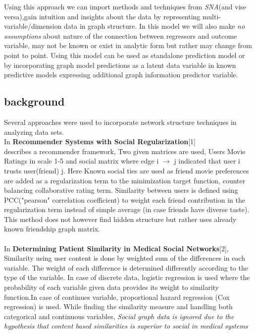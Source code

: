 \documentclass[a4paper]{article}
\begin{document}
Using this approach we can import methods and techniques from \emph{SNA}(and vise versa),gain intuition and insights about the data by representing multi-variable/dimension data in graph structure.
In this model we will also make\emph{ no assumptions} about nature of the connection between regressors and outcome variable, may not be known or exist in analytic form but rather may change from point to point.
Using this model can be used as standalone prediction model or by incorporating graph model predictions as a latent data variable in known predictive models expressing additional graph information predictor variable. 

\subsection{background}
Several approaches were used to incorporate network structure techniques in analyzing  data sets. \\
In \textbf {Recommender Systems with Social Regularization}[1] \\
describes a  recommender framework, Two given matrices are used, Users Movie Ratings in scale 1-5 and social matrix where edge  i $\rightarrow$ j indicated that user i trusts user(friend) j.  Here Known social ties  are  used as friend movie preferences  are added as a regularization term to the minimization target function, counter balancing collaborative rating term. Similarity between users is defined using PCC("pearson" correlation coefficient) to weight each friend contribution in the regularization term instead of simple average (in case friends have diverse taste).  This method does not however find hidden structure but rather uses already known friendship graph matrix. \\
\\
In \textbf{Determining Patient Similarity in Medical Social Networks}[2], Similarity using user content is done by weighted sum of the differences in each variable.
The weight of each difference is determined differently according to the type of the variable. In case of discrete data, logistic regression is used where the probability of each variable 
given data provides its weight to similarity  function.In case of continues variable, 
proportional hazard regression (Cox regression) is used. 
While finding the similarity measure and handling both categorical and continuous variables,
\emph{Social graph data is ignored due to the hypothesis that content based similarities is superior to social in medical systems}  \\
\end{document}
